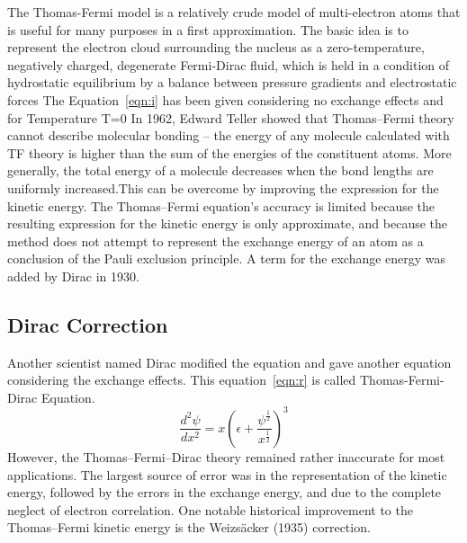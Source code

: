The Thomas-Fermi model is a relatively crude model of multi-electron atoms that is useful for many purposes in a first approximation. The basic idea is to represent the electron cloud surrounding the nucleus as a zero-temperature, negatively charged, degenerate Fermi-Dirac fluid, which is held in a condition of hydrostatic equilibrium by a balance between pressure gradients and electrostatic forces
The Equation~\ref{eqn:i} has been given considering no exchange effects and for Temperature T=0
\newline
\newline
In 1962, Edward Teller showed that Thomas–Fermi theory cannot describe molecular bonding – the energy of any molecule calculated with TF theory is higher than the sum of the energies of the constituent atoms. More generally, the total energy of a molecule decreases when the bond lengths are uniformly increased.This can be overcome by improving the expression for the kinetic energy.
\newline
\newline
The Thomas–Fermi equation's accuracy is limited because the resulting expression for the kinetic energy is only approximate, and because the method does not attempt to represent the exchange energy of an atom as a conclusion of the Pauli exclusion principle. A term for the exchange energy was added by Dirac in 1930.
\newline
\subsection{Dirac Correction}
Another scientist named Dirac modified the equation and gave another equation considering the exchange effects. This equation~\ref{eqn:r} is called Thomas-Fermi-Dirac Equation.
\newline
\newline
\begin{equation}
\frac{d^2 \psi}{dx^2}=x(\epsilon+\frac{\psi^\frac{1}{2}}{x^\frac{1}{2}}  )^3
\label{eqn:r}
\end{equation}
\newline
\newline
However, the Thomas–Fermi–Dirac theory remained rather inaccurate for most applications. The largest source of error was in the representation of the kinetic energy, followed by the errors in the exchange energy, and due to the complete neglect of electron correlation.
\newline
\newline
One notable historical improvement to the Thomas–Fermi kinetic energy is the Weizsäcker (1935) correction.
